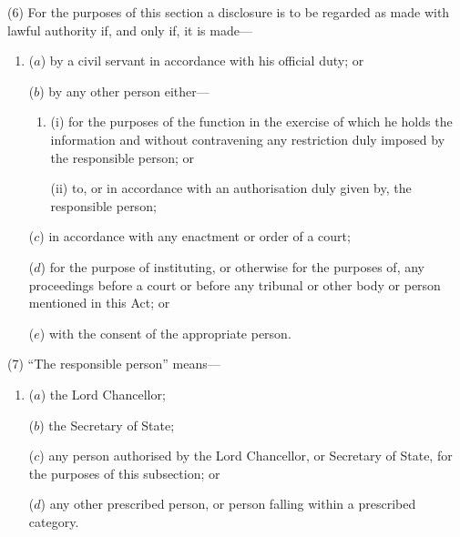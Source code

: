 \documentclass[12pt,a4paper]{article}
\begin{document}
(6) For the purposes of this section a disclosure is to be regarded as made with lawful authority if, and only if, it is made—
\begin{enumerate}\item[]
($a$) by a civil servant in accordance with his official duty; or

($b$) by any other person either—
\begin{enumerate}\item[]
(i) for the purposes of the function in the exercise of which he holds the information and without contravening any restriction duly imposed by the responsible person; or

(ii) to, or in accordance with an authorisation duly given by, the responsible person;
\end{enumerate}

($c$) in accordance with any enactment or order of a court;

($d$) for the purpose of instituting, or otherwise for the purposes of, any proceedings before a court or before any tribunal or other body or person mentioned in this Act; or

($e$) with the consent of the appropriate person.
\end{enumerate}

(7) “The responsible person” means—
\begin{enumerate}\item[]
($a$) the Lord Chancellor;

($b$) the Secretary of State;

($c$) any person authorised by the Lord Chancellor, or Secretary of State, for the purposes of this subsection; or

($d$) any other prescribed person, or person falling within a prescribed category.
\end{enumerate}
\end{document}
